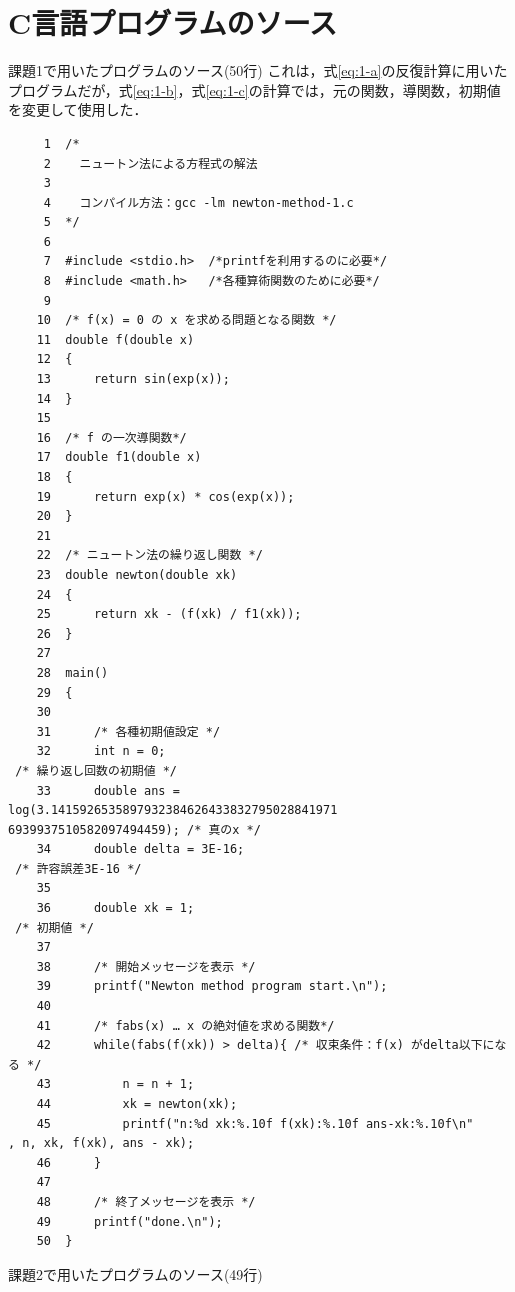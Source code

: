 \documentclass[12pt]{jarticle}
\renewcommand  \[  {\begin{eqnarray}}
\renewcommand  \]  {\end{eqnarray}}
\begin{document}
\section{C言語プログラムのソース}
課題1で用いたプログラムのソース(50行)
これは，式\ref{eq:1-a}の反復計算に用いたプログラムだが，式\ref{eq:1-b}，式\ref{eq:1-c}の計算では，元の関数，導関数，初期値を変更して使用した．
\begin{verbatim}
     1	/*
     2	  ニュートン法による方程式の解法
     3	
     4	  コンパイル方法：gcc -lm newton-method-1.c
     5	*/
     6	
     7	#include <stdio.h>  /*printfを利用するのに必要*/
     8	#include <math.h>   /*各種算術関数のために必要*/
     9	
    10	/* f(x) = 0 の x を求める問題となる関数 */
    11	double f(double x)
    12	{
    13	    return sin(exp(x));
    14	}
    15	
    16	/* f の一次導関数*/
    17	double f1(double x)
    18	{
    19	    return exp(x) * cos(exp(x));
    20	}
    21	
    22	/* ニュートン法の繰り返し関数 */
    23	double newton(double xk)
    24	{
    25	    return xk - (f(xk) / f1(xk));
    26	}
    27	
    28	main()
    29	{
    30	
    31	    /* 各種初期値設定 */
    32	    int n = 0;                                                                         
 /* 繰り返し回数の初期値 */
    33	    double ans = log(3.1415926535897932384626433832795028841971
6939937510582097494459); /* 真のx */
    34	    double delta = 3E-16;                                                              
 /* 許容誤差3E-16 */
    35	
    36	    double xk = 1;                                                                     
 /* 初期値 */
    37	
    38	    /* 開始メッセージを表示 */
    39	    printf("Newton method program start.\n");
    40	
    41	    /* fabs(x) … x の絶対値を求める関数*/
    42	    while(fabs(f(xk)) > delta){ /* 収束条件：f(x) がdelta以下になる */
    43	        n = n + 1;
    44	        xk = newton(xk);
    45	        printf("n:%d xk:%.10f f(xk):%.10f ans-xk:%.10f\n"
, n, xk, f(xk), ans - xk);
    46	    }
    47	
    48	    /* 終了メッセージを表示 */
    49	    printf("done.\n");
    50	}
\end{verbatim}
課題2で用いたプログラムのソース(49行)
\end{document}
